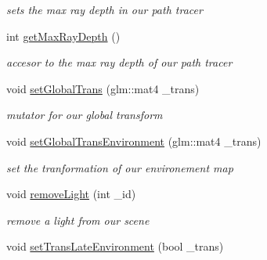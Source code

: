 \begin{DoxyCompactItemize}
\begin{DoxyCompactList}\small\item\em sets the max ray depth in our path tracer \end{DoxyCompactList}\item 
\hypertarget{class_path_tracer_scene_a497b9e8516f9654acaca48a7c4f6ab84}{int \hyperlink{class_path_tracer_scene_a497b9e8516f9654acaca48a7c4f6ab84}{get\-Max\-Ray\-Depth} ()}\label{class_path_tracer_scene_a497b9e8516f9654acaca48a7c4f6ab84}

\begin{DoxyCompactList}\small\item\em accesor to the max ray depth of our path tracer \end{DoxyCompactList}\item 
void \hyperlink{class_path_tracer_scene_a0af394a6fed9de78c3f4d215bfdd1129}{set\-Global\-Trans} (glm\-::mat4 \-\_\-trans)
\begin{DoxyCompactList}\small\item\em mutator for our global transform \end{DoxyCompactList}\item 
\hypertarget{class_path_tracer_scene_a4833efcdf8e90050b6f72eeffd3cb715}{void \hyperlink{class_path_tracer_scene_a4833efcdf8e90050b6f72eeffd3cb715}{set\-Global\-Trans\-Environment} (glm\-::mat4 \-\_\-trans)}\label{class_path_tracer_scene_a4833efcdf8e90050b6f72eeffd3cb715}

\begin{DoxyCompactList}\small\item\em set the tranformation of our environement map \end{DoxyCompactList}\item 
\hypertarget{class_path_tracer_scene_a985c787f3a950b0378e3998035c54e62}{void \hyperlink{class_path_tracer_scene_a985c787f3a950b0378e3998035c54e62}{remove\-Light} (int \-\_\-id)}\label{class_path_tracer_scene_a985c787f3a950b0378e3998035c54e62}

\begin{DoxyCompactList}\small\item\em remove a light from our scene \end{DoxyCompactList}\item 
\hypertarget{class_path_tracer_scene_aab2d3d392377547d37ce1eb4b17c3eb4}{void \hyperlink{class_path_tracer_scene_aab2d3d392377547d37ce1eb4b17c3eb4}{set\-Trans\-Late\-Environment} (bool \-\_\-trans)}\label{class_path_tracer_scene_aab2d3d392377547d37ce1eb4b17c3eb4}


\end{DoxyCompactItemize}
